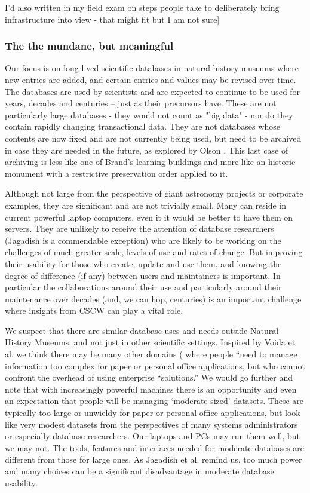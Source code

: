 I'd also written in my field exam on steps people take to deliberately bring infrastructure into view - that might fit but I am not sure]

\subsubsection{The the mundane, but meaningful}

Our focus is on long-lived scientific databases in natural history museums where new entries are added, and certain entries and values may be revised over time. The databases are used by scientists and are expected to continue to be used for years, decades and centuries – just as their precursors have. These are not particularly large databases - they would not count as "big data" - nor do they contain rapidly changing transactional data. They are not databases whose contents are now fixed and are not currently being used, but need to be archived in case they are  needed in the future, as explored by Olson \cite{olson2010database}. This last case of archiving is less like one of Brand’s learning buildings and more like an historic monument with a restrictive preservation order applied to it.

Although not large from the perspective of giant astronomy projects or corporate examples, they are  significant and are not trivially small. Many can reside in current powerful laptop computers, even it it would be better to have them on servers. They are unlikely to receive the attention of database researchers (Jagadish is a commendable exception) who are likely to be working on the challenges of much greater scale, levels of use and rates of change. But improving their usability for those who create, update and use them, and knowing the degree of difference (if any) between users and maintainers is important. In particular the collaborations around their use and particularly around their maintenance over decades (and, we can hop, centuries) is an important challenge where insights from CSCW can play a vital role.

We suspect that there are similar database uses and needs outside Natural History Museums, and not just in other scientific settings. Inspired by Voida et al. we think there may be  many other domains ( where people “need to manage information too complex for paper or personal office applications, but who cannot confront the overhead of using enterprise “solutions.” We would go further and note that with increasingly powerful machines there is an opportunity and even an expectation that people will be managing ‘moderate sized’ datasets. These are typically too large or unwieldy for paper or personal office applications, but look like very modest datasets from the perspectives of many systems administrators or especially database researchers. Our laptops and PCs may run them well, but we may not. The tools, features and interfaces needed for moderate databases are different from those for large ones. As Jagadish et al. remind us, too much power and many choices can be a significant disadvantage in moderate database usability.

